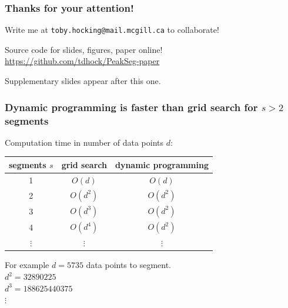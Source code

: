 \documentclass{beamer}
\begin{document}
\begin{frame}
  \frametitle{Thanks for your attention!}
  Write me at \alert{\texttt{toby.hocking@mail.mcgill.ca}} to collaborate!

  \vskip 1cm

  Source code for slides, figures, paper online!\\
  \small
  \url{https://github.com/tdhock/PeakSeg-paper}
  \vskip 1cm

  Supplementary slides appear after this one.

\end{frame}








\begin{frame}
  \frametitle{Dynamic programming is faster than grid search for $s>
    2$ segments}

  Computation time in number of data points $d$:

  \vskip 1cm

  \begin{tabular}{ccc}
    segments $s$ & grid search & dynamic programming \\
    \hline
    1 & $O(d)$ & $O(d)$ \\
    2 & $O(d^2)$ & $O(d^2)$ \\
    3 & $O(d^3)$ & $O(d^2)$ \\
    4 & $O(d^4)$ & $O(d^2)$ \\
    $\vdots$ &     $\vdots$ &     $\vdots$ 
  \end{tabular}

  \vskip 1cm

  For example $d = 5735$ data points to segment.\\
  $d^2 = 32890225$\\
  $d^3 = 188625440375$\\
  $\vdots$
\end{frame}


\end{document}
